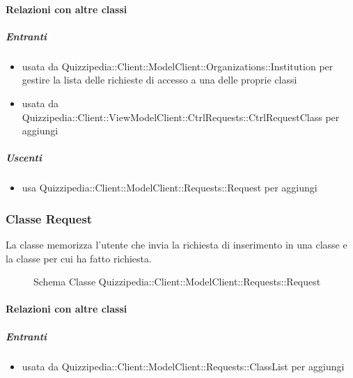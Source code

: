 \paragraph{Relazioni con altre classi}
\subparagraph{Entranti}
\begin{itemize}
\item usata da Quizzipedia::Client::ModelClient::Organizations::Institution per gestire la lista delle richieste di accesso a una delle proprie classi
\item usata da Quizzipedia::Client::ViewModelClient::CtrlRequests::CtrlRequestClass per aggiungi
\end{itemize}
\subparagraph{Uscenti}
\begin{itemize}
\item usa Quizzipedia::Client::ModelClient::Requests::Request per aggiungi
\end{itemize}
\subsubsection{Classe Request}
La classe memorizza l'utente che invia la richiesta di inserimento in una classe e la classe per cui ha fatto richiesta.
\begin{figure}[H]
\centering
\noindent{}
\caption[Schema Classe Request]{Schema Classe Quizzipedia::Client::ModelClient::Requests::Request}
\end{figure}
\paragraph{Relazioni con altre classi}
\subparagraph{Entranti}
\begin{itemize}
\item usata da Quizzipedia::Client::ModelClient::Requests::ClassList per aggiungi
\end{itemize}
